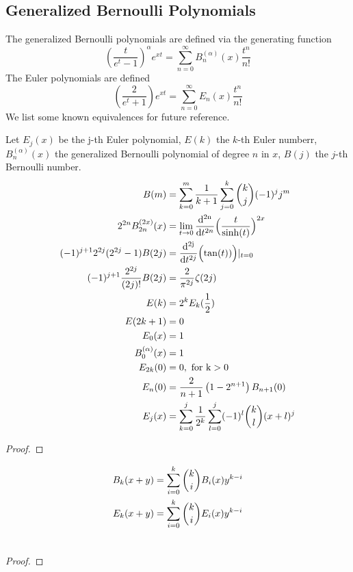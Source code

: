 \documentclass[fleqn,a4paper,9pt]{article}
\begin{document}
\begin{flushleft}
\section{Generalized Bernoulli Polynomials}
The generalized Bernoulli polynomials are defined via the generating function
$$\left(\frac{t}{e^t-1}\right)^\alpha e^{xt}=\sum_{n=0}^\infty B_n^{(\alpha)}(x)\frac{t^n}{n!}$$
The Euler polynomials  are defined
$$\left(\frac{2}{e^t+1}\right) e^{xt}=\sum_{n=0}^\infty E_n(x)\frac{t^n}{n!}$$
We list some known equivalences for future reference.
\begin{proposition}
 Let $E_j(x)$ be the j-th Euler polynomial, $E(k)$ the $k$-th Euler numberr, $B_n^{(\alpha)}(x)$ the generalized Bernoulli polynomial of degree $n$ in $x$, $B(j)$ the $j$-th Bernoulli number.
\begin{align}
B(m)&=\sum_{k=0}^m\frac{1}{k+1}\sum_{j=0}^k\binom{k}{j}(-1)^jj^m\\
2^{2n}B_{2n}^{(2x)}(x)&=\lim_{t\to 0}\frac{  \mathrm{  d^{2n}  }   }{\mathrm{d}t^{2n}  }        \Bigl(\frac{t}{\sinh(t)}\Bigr)^{2x}\\
(-1)^{j+1}2^{2j}(2^{2j}-1)B(2j)&=\frac{  \mathrm{  d^{2j}  }   }{\mathrm{d}t^{2j}  }        \Bigl(\tan(t))\Bigr)\vert_{t=0}\\
(-1)^{j+1}\frac{2^{2j}}{(2j)!}B(2j)&=\frac{2}{\pi^{2j}}\zeta(2j)\\
E(k)&=2^kE_k(\frac {1} {2}) \\
E(2k+1)&=0\\
E_0(x)&=1\\
B_{0}^{(\alpha)}(x)&=1\\
E_{2k}(0)&=0, \rm{\  for\  }k>0\\
E_n(0)&=\frac{2}{n+1}\left(1-2^{n+1}\right)B_{n+1}(0)\\
E_j(x)&=\sum_{k=0}^j\frac{1}{2^k}\sum_{l=0}^j(-1)^l \binom{k}{l}(x+l)^j\\
\end{align}
\end{proposition}
\begin{proof}
\end{proof}
\begin{proposition}\label{xplusy}
\begin{align}
B_k(x+y)&=\sum_{i=0}^k\binom{k}{i}B_i(x)y^{k-i}\\\notag
E_k(x+y)&=\sum_{i=0}^k\binom{k}{i}E_i(x)y^{k-i}\\\notag
\end{align}
\end{proposition}
\begin{proof}

\end{proof}
\end{flushleft}
\end{document}
